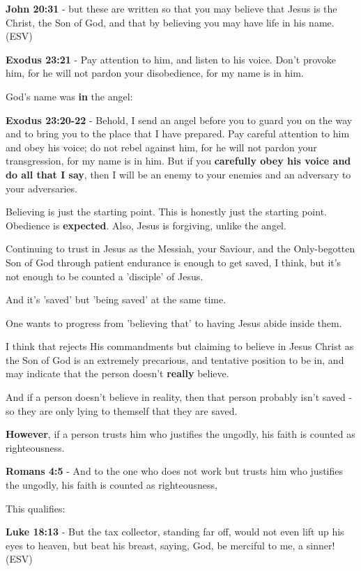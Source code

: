 \documentclass[11pt]{article}
\begin{document}
\textbf{John 20:31} - but these are written so that you may believe that Jesus is the Christ, the Son of God, and that by believing you may have life in his name. (ESV)

\textbf{Exodus 23:21} - Pay attention to him, and listen to his voice. Don't provoke him, for he will not pardon your disobedience, for my name is in him.

God's name was \textbf{in} the angel:

\textbf{Exodus 23:20-22} - Behold, I send an angel before you to guard you on the way and to bring you to the place that I have prepared. Pay careful attention to him and obey his voice; do not rebel against him, for he will not pardon your transgression, for my name is in him. But if you \textbf{carefully obey his voice and do all that I say}, then I will be an enemy to your enemies and an adversary to your adversaries.

Believing is just the starting point. This is honestly just the starting point. Obedience is \textbf{expected}. Also, Jesus is forgiving, unlike the angel.

Continuing to trust in Jesus as the Messiah, your Saviour, and the Only-begotten Son of God through patient endurance is enough to get saved, I think, but it's not enough to be counted a 'disciple' of Jesus.

And it's 'saved' but 'being saved' at the same time.

One wants to progress from 'believing that' to having Jesus abide inside them.

I think that rejects His commandments but claiming to believe in Jesus Christ as the Son of God is an extremely precarious, and tentative position to be in,
and may indicate that the person doesn't \textbf{really} believe.

And if a person doesn't believe in reality, then that person probably isn't saved - so they are only lying to themself that they are saved.

\textbf{However}, if a person trusts him who justifies the ungodly, his faith is counted as righteousness.

\textbf{Romans 4:5} - And to the one who does not work but trusts him who justifies the ungodly, his faith is counted as righteousness,

This qualifies:

\textbf{Luke 18:13} - But the tax collector, standing far off, would not even lift up his eyes to heaven, but beat his breast, saying, God, be merciful to me, a sinner! (ESV)
\end{document}
